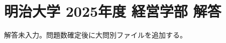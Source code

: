\documentclass[../../uem_mat_mei_a.tex]{subfiles}
\begin{document}
    \section{明治大学 2025年度 経営学部 解答}

    解答未入力。問題数確定後に大問別ファイルを追加する。
\end{document}
